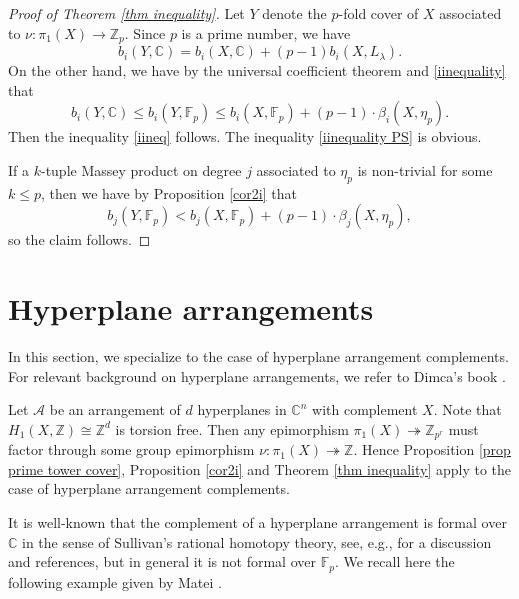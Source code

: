 \documentclass[12pt,leqno,twoside]{amsart}
\theoremstyle{plain}
\theoremstyle{definition}
\newcommand{\C}{\mathbb{C}}
\newcommand{\Z}{\mathbb{Z}}
\newcommand{\F}{\mathbb{F}}
\newcommand{\sA}{\mathcal{A}}
\begin{document}
 \begin{proof}[Proof of Theorem \ref{thm inequality}] Let $Y$ denote the $p$-fold cover of $X$ associated to $\nu\colon \pi_1(X)\to \Z_p$.
Since $p$ is a prime number, we have
 $$b_i(Y,\C)= b_i(X,\C)+(p-1)b_i(X,L_\lambda). $$
On the other hand, we have by the universal coefficient theorem and \eqref{iinequality} that
$$ b_i(Y,\C)                  \leq  b_i(Y,\F_p) \leq  b_i(X,\F_p)+   (p-1)\cdot \beta_i(X,\eta_p). $$ 
Then the  inequality \eqref{iineq} follows. The  inequality \eqref{iinequality PS} is obvious. 

If a $k$-tuple Massey product on degree $j$ associated to $\eta_p$ is non-trivial for some  $k\leq p$, then we have by Proposition \ref{cor2i} that $$b_j(Y,\F_p) <  b_j(X,\F_p)+   (p-1)\cdot \beta_j(X,\eta_p),$$ so the claim follows.  \end{proof}
 

\section{Hyperplane arrangements}\label{sec5}
In this section, we specialize to the case of hyperplane arrangement complements. For relevant background on hyperplane arrangements, we refer to Dimca's book \cite{Dim17}. 

Let $\sA$ be an arrangement of $d$ hyperplanes in $\C^n$ with complement $X$.
Note that $H_1(X,\Z)\cong \Z^d$ is torsion free. Then any epimorphism $\pi_1(X)\twoheadrightarrow \Z_{p^r}$ must factor through some group epimorphism $\nu \colon \pi_1(X)\twoheadrightarrow \Z$. Hence Proposition \ref{prop prime tower cover}, Proposition  \ref{cor2i} and Theorem \ref{thm inequality} apply to the case of hyperplane arrangement complements.


It is well-known that the complement of a hyperplane arrangement is formal over $\C$ in the sense of Sullivan’s rational
homotopy theory, see, e.g., \cite{Dup} for a discussion and references, but in general it is not formal over $\F_p$. 
We recall here the following example given by Matei \cite{Mat}. 
\end{document}
